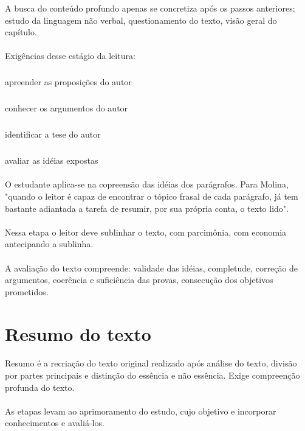 A busca do conteúdo profundo apenas se concretiza após os passos anteriores; estudo da linguagem não verbal, questionamento do texto, visão geral do capítulo.

\paragraph{}
Exigências desse estágio da leitura:

\subparagraph{}
apreender as proposições do autor
\subparagraph{}
conhecer os argumentos do autor
\subparagraph{}
identificar a tese do autor
\subparagraph{}
avaliar as idéias expostas

\paragraph{}
O estudante aplica-se na copreensão das idéias dos parágrafos. Para Molina, "quando o leitor é capaz de encontrar o tópico frasal de cada parágrafo, já tem bastante adiantada a tarefa de resumir, por sua própria conta, o texto lido".

\paragraph{}
Nessa etapa o leitor deve sublinhar o texto, com parcimônia, com economia antecipando a sublinha.

\paragraph{}
A avaliação do texto compreende: validade das idéias, completude, correção de argumentos, coerência e suficiência das provas, consecução dos objetivos prometidos.

\section{Resumo do texto}

\paragraph{}

Resumo é a recriação do texto original realizado após análise do texto, divisão por partes principais e distinção do essência e não essência. Exige compreenção profunda do texto.

\paragraph{}
As etapas levam ao aprimoramento do estudo, cujo objetivo e incorporar conhecimentos e avaliá-los.

